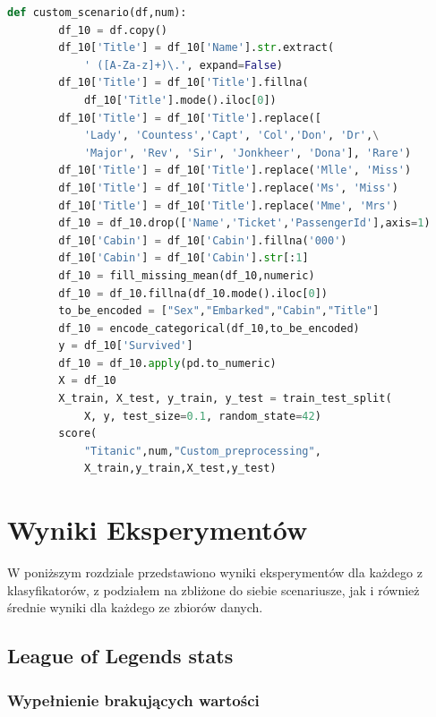 \documentclass{book}
\begin{document}
\begin{lstlisting}[language=Python, caption={Usuwanie 
    wartości odstających}, captionpos=b]
    def custom_scenario(df,num):
        df_10 = df.copy()
        df_10['Title'] = df_10['Name'].str.extract(
            ' ([A-Za-z]+)\.', expand=False)
        df_10['Title'] = df_10['Title'].fillna(
            df_10['Title'].mode().iloc[0])
        df_10['Title'] = df_10['Title'].replace([
            'Lady', 'Countess','Capt', 'Col','Don', 'Dr',\
            'Major', 'Rev', 'Sir', 'Jonkheer', 'Dona'], 'Rare')
        df_10['Title'] = df_10['Title'].replace('Mlle', 'Miss')
        df_10['Title'] = df_10['Title'].replace('Ms', 'Miss')
        df_10['Title'] = df_10['Title'].replace('Mme', 'Mrs')
        df_10 = df_10.drop(['Name','Ticket','PassengerId'],axis=1)
        df_10['Cabin'] = df_10['Cabin'].fillna('000')
        df_10['Cabin'] = df_10['Cabin'].str[:1]
        df_10 = fill_missing_mean(df_10,numeric)
        df_10 = df_10.fillna(df_10.mode().iloc[0])
        to_be_encoded = ["Sex","Embarked","Cabin","Title"]
        df_10 = encode_categorical(df_10,to_be_encoded)
        y = df_10['Survived']
        df_10 = df_10.apply(pd.to_numeric)
        X = df_10
        X_train, X_test, y_train, y_test = train_test_split(
            X, y, test_size=0.1, random_state=42)
        score(
            "Titanic",num,"Custom_preprocessing",
            X_train,y_train,X_test,y_test)
\end{lstlisting}

\chapter{Wyniki Eksperymentów}

W poniższym rozdziale przedstawiono wyniki eksperymentów dla każdego z klasyfikatorów, 
z podziałem na zbliżone do siebie scenariusze, jak i również średnie wyniki dla każdego 
ze zbiorów danych.

\section{League of Legends stats}

\subsection{Wypełnienie brakujących wartości}
\end{document}
